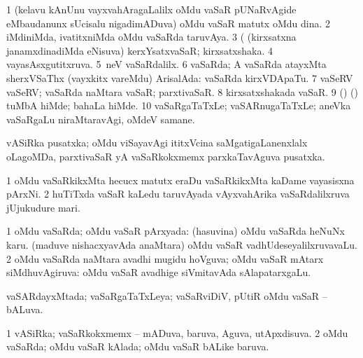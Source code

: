 \noindent
\gl{\pagu}
\bmng
\bnum
\num{1}  (kelavu kAnUnu vayxvahAragaLalilx oMdu vaSaR  pUNaRvAgide eMbaudanunx sUcisalu nigadimADuva) oMdu vaSaR matutx oMdu dina. 
\num{2}  iMdiniMda, ivatitxniMda oMdu vaSaRda taruvAya. 
\num{3}  (  (kirxsatxna janamxdinadiMda eNisuva) kerxYsatxvaSaR; kirxsatxshaka.  
\num{4}  vayasAsxgutitxruva.  
\num{5}  \kirxsha \eng{$\ldots$}\,neV vaSaRdalilx.  
\num{6}  vaSaRda; A vaSaRda atayxMta sherxVSaThx (vayxkitx \mo vareMdu) ArisalAda:  vaSaRda kirxVDApaTu. 
\num{7}  vaSeRV vaSeRV; vaSaRda naMtara vaSaR; parxtivaSaR.  
\num{8}  kirxsatxshakada vaSaR.  
\num{9}   (\birx) (\AmA) tuMbA hiMde; bahaLa hiMde.
\num{10}  vaSaRgaTaTxLe; vaSARnugaTaTxLe; aneVka vaSaRgaLu niraMtaravAgi, oMdeV samane.
\enum
\emng 
\eentry

\bentry
{} 
\gl{\nA} 
\bmng
vASiRka pusatxka; oMdu viSayavAgi ititxVcina saMgatigaLanenxlalx oLagoMDa, parxtivaSaR yA vaSaRkokxmemx  parxkaTavAguva pusatxka.
\emng
\eentry

\bentry
{} 
\gl{\nA} 
\bmng
\bnum
\num{1} oMdu vaSaRkikxMta hecucx matutx eraDu vaSaRkikxMta kaDame vayasisxna pArxNi. 
\num{2} huTiTxda vaSaR kaLedu taruvAyada vAyxvahArika vaSaRdalilxruva jUjukudure mari.
\enum
\emng
\eentry

\bentry
{} 
\gl{\gu} 
\bmng
\bnum
\num{1} oMdu vaSaRda; oMdu vaSaR pArxyada:  (hasuvina) oMdu vaSaRda heNuNx karu.  (maduve nishacxyavAda anaMtara) oMdu vaSaR vadhUdeseyalilxruvavaLu. 
\num{2} oMdu vaSaRda naMtara avadhi mugidu hoVguva; oMdu vaSaR mAtarx siMdhuvAgiruva:  oMdu vaSaR avadhige siVmitavAda sAlapatarxgaLu.
\enum
\emng
\eentry


\bentry
{} 
\gl{\gu} 
\bmng
vaSARdayxMtada; vaSaRgaTaTxLeya; vaSaRviDiV, pUtiR oMdu vaSaR -- bALuva.
\emng
\eentry

\bentry
{} 
\gl{\gu} 
\bmng
\bnum
\num{1} vASiRka; vaSaRkokxmemx -- mADuva, baruva, Aguva, utApxdisuva. 
\num{2} oMdu vaSaRda; oMdu vaSaR kAlada; oMdu vaSaR bALike baruva.
\enum
\emng
\eentry

